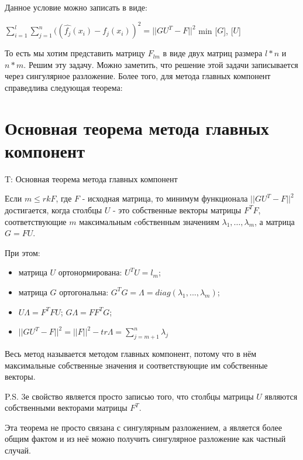  Данное условие можно записать в виде: \par
 $\displaystyle\sum_{i=1}^{l}\displaystyle\sum_{j=1}^{n} ((\hat{f_j}(x_i)-f_j(x_i))^2 = ||GU^T - F||^2$ \rightarrow min [$G$], [$U$]

То есть мы хотим представить матрицу $F_{lm}$ в виде двух матриц размера $l*n$ и $n*m$. Решим эту задачу. Можно заметить, что решение этой задачи записывается через сингулярное разложение. Более того, для метода главных компонент справедлива следующая теорема:\par


\section{Основная теорема метода главных компонент}

T: Основная теорема метода главных компонент\par
Если $m \le rk F$, где $F$ - исходная матрица, то минимум функционала $||GU^T - F||^2$ достигается, когда столбцы $U$ - это собственные векторы матрицы $F^TF$, соответствующие $m$ максимальным cобственным значениям $\lambda_1, \dotsc, \lambda_m$, а матрица $G = FU$. \par
При этом:
\begin{itemize}
    \item матрица $U$ ортонормирована: $U^TU = l_m$;
    \item матрица $G$ ортогональна: $G^TG = \Lambda = diag(\lambda_1,...,\lambda_m)$;
    \item $U\Lambda=F^TFU$; $G\Lambda=FF^TG$;
    \item $||GU^T-F||^2=||F||^2-tr\Lambda = \displaystyle\sum_{j=m+1}^n\lambda_j$
\end{itemize}

Весь метод называется методом главных компонент, потому что в нём максимальные  собственные значения и соответствующие им собственные векторы.\par
P.S. 3е свойство является просто записью того, что столбцы матрицы $U$ являются собственными векторами матрицы $F^T$. 

Эта теорема не просто связана с сингулярным разложением, а является более общим фактом и из неё можно получить сингулярное разложение как частный случай.

